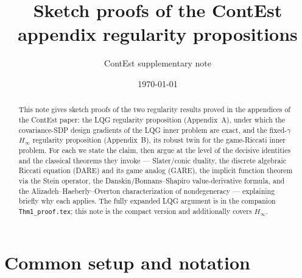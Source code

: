 \documentclass[11pt]{article}
\title{\bf Sketch proofs of the ContEst appendix regularity propositions}
\author{ContEst supplementary note}
\date{\today}
\theoremstyle{definition}
\begin{document}
\maketitle

\begin{abstract}
This note gives sketch proofs of the two regularity results proved in the
appendices of the ContEst paper: the LQG regularity proposition
(Appendix~A), under which the covariance-SDP design gradients of the LQG inner
problem are exact, and the fixed-$\gamma$ $H_\infty$ regularity proposition
(Appendix~B), its robust twin for the game-Riccati inner problem. For each we
state the claim, then argue at the level of the decisive identities and the
classical theorems they invoke --- Slater/conic duality, the discrete algebraic
Riccati equation (DARE) and its game analog (GARE), the implicit function theorem
via the Stein operator, the Danskin/Bonnans--Shapiro value-derivative formula, and
the Alizadeh--Haeberly--Overton characterization of nondegeneracy --- explaining
briefly why each applies. The fully expanded LQG argument is in the companion
\texttt{Thm1\_proof.tex}; this note is the compact version and additionally covers
$H_\infty$.
\end{abstract}

\section{Common setup and notation}\label{sec:setup}
\end{document}
